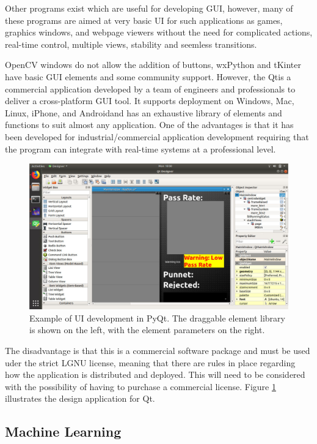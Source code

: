 \documentclass[fleqn,twoside]{article}
\begin{document}
Other programs exist which are useful for developing GUI, however, many of these programs are aimed at very basic UI for such applications as games, graphics windows, and webpage viewers without the need for complicated actions, real-time control, multiple views, stability and seemless transitions.

OpenCV windows do not allow the addition of buttons, wxPython and tKinter have basic GUI elements and some community support. However, the Qt\textregistered is a commercial application developed by a team of engineers and professionals to deliver a cross-platform GUI tool. It supports deployment on Windows\textregistered, Mac\textregistered, Linux\textregistered, iPhone\textregistered, and Android\textregistered and has an exhaustive library of elements and functions to suit almost any application. One of the advantages is that it has been developed for industrial/commercial application development requiring that the program can integrate with real-time systems at a professional level.




\begin{figure}[h]
	\centering
	\includegraphics[width=.8\linewidth]{qt.png}
	\caption{Example of UI development in PyQt\textregistered. The draggable element library is shown on the left, with the element parameters on the right.}
	\label{fig:qt}
\end{figure}%


The disadvantage is that this is a commercial software package and must be used uder the strict LGNU license, meaning that there are rules in place regarding how the application is distributed and deployed. This will need to be considered with the possibility of having to purchase a commercial license. Figure \ref{fig:qt} illustrates the design application for Qt\textregistered.



\subsection{Machine Learning}
\end{document}
